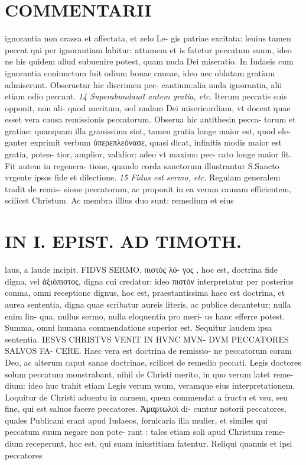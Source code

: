 \documentclass{article}
\begin{document}
\begin{pages}
\section*{COMMENTARII }\pstart ignorantia non crassa et affectata, et zelo Le- gis patriae excitata: leuius tamen peccat qui per ignorantiam labitur: attamem et is fatetur peccatum suum, ideo ne his quidem aliud subuenire potest, quam nuda Dei miseratio. In Iudaeis cum ignorantia coniunctum fuit odium bonae causae, ideo nec oblatam gratiam admiserunt. Obseruetur hic discrimen pec- cantium:alia nuda ignorantia, alii etiam odio peccant.  \pend
\textit{14 Superabundauit autem gratia, etc. }\pstart Iterum peccatis suis opponit, non ali- quod meritum, sed nudam Dei misericordiam, vt doceat quae esset vera causa remissionis peccatorum. Obserua hic antithesin pecca- torum et gratiae: quanquam illa grauissima sint, tamen gratia longe maior est, quod ele- ganter exprimit verbum ὐπερεπλεόνασε, quasi dicat, infinitis modis maior est gratia, poten- tior, amplior, validior: adeo vt maximo pec- cato longe maior fit. Fit autem in regenera- tione, quando corda sanctorum illustrantur S.Sancto vrgente ipsos fide et dilectione.  \pend
\textit{15 Fidus est sermo, etc. }\pstart Regulam generalem tradit de remis- sione peccatorum, ac proponit in ea veram causam efficientem, scilicet Christum. Ac membra illius duo sunt: remedium et eius  \pend
\section*{IN I. EPIST. AD TIMOTH. }
\marginpar{[ p.33 ]}\pstart laus, a laude incipit. FIDVS SERMO, πιστὸς λό- γος , hoc est, doctrina fide digna, vel ἀξιόπιστος, digna cui credatur: ideo πιστὸν interpretatur per posterius conma, omni receptione dignus, hoc est, praestantissima haec est doctrina, et aurea sententia, digna quae scribatur aureis literis, ac publice decantetur: nulla enim lin- qua, nullus sermo, nulla eloquentia pro meri- us hanc efferre potest. Summa, omni humana commendatione superior est.  \pend\pstart Sequitur laudem ipsa sententia. IESVS CHRISTVS VENIT IN HVNC MVN- DVM PECCATORES SALVOS FA- CERE. Haec vera est doctrina de remissio- ne peccatorum coram Deo, ac alterum caput sanae doctrinae, scilicet de remedio peccati. Legis doctores solum peccatum monstrabant, nihil de Christi merito, in quo verum latet reme- dium: ideo huc trahit etiam Legis verum vsum, veramque eius interpretationem.  \pend\pstart Loquitur de Christi aduentu in carnem, quem commendat a fructu et vsu, seu fine, qui est saluos facere peccatores. Ἁμαρτωλοὶ di- cuntur notorii peccatores, quales Publicani erant apud Iudaeos, fornicaria illa mulier, et similes qui peccatum suum negare non pote- rant : tales etiam soli apud Christum reme- dium receperunt, hoc est, qui suam iniustitiam fatentur. Reliqui quanuis et ipsi peccatores  \pend

\end{pages}
\end{document}
